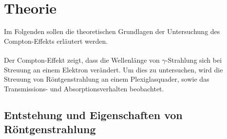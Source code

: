 \section{Theorie}
\label{sec:theorie}

    Im Folgenden sollen die theoretischen Grundlagen der Untersuchung des Compton-Effekts erläutert werden.\\
    \\
    Der Compton-Effekt zeigt,
    dass die Wellenlänge von $\gamma$-Strahlung sich bei Streuung an einem Elektron verändert.
    Um dies zu untersuchen,
    wird die Streuung von Röntgenstrahlung an einem Plexiglasquader, 
    sowie das Transmissions- und Absorptionsverhalten beobachtet.

\subsection{Entstehung und Eigenschaften von Röntgenstrahlung}
\label{sec:röntgen}

